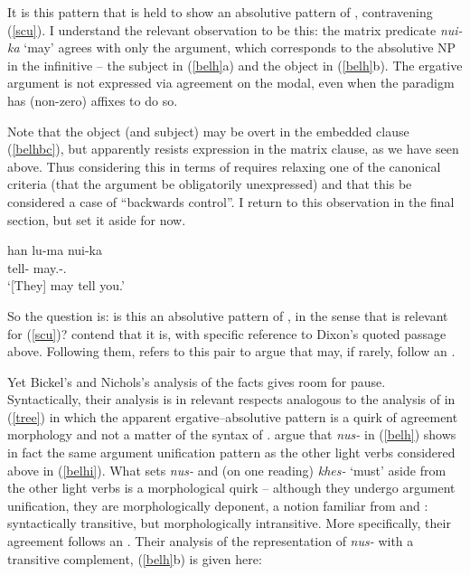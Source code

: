 \documentclass[output=paper]{langsci/langscibook}
\begin{document}
It is this pattern that is held to show an absolutive pattern of ,
contravening (\ref{scu}). I understand the relevant observation to be this: the
matrix predicate \emph{nui-ka} `may' agrees with only the \Ssg{} argument,
which corresponds to the absolutive NP in the infinitive -- the subject in
(\ref{belh}a) and the object in (\ref{belh}b). The ergative argument is not
expressed via agreement on the modal, even when the paradigm has (non-zero)
affixes to do so.

Note that the object (and subject) may be overt in the embedded clause
(\ref{belhbc}), but apparently resists expression in the matrix clause, as we
have seen above. Thus considering this in terms of  requires relaxing
one of the canonical criteria (that the argument be obligatorily unexpressed)
and that this be considered a case of \enquote{backwards control}. I return to
this observation in the final section, but set it aside for now.

\ea \label{belhbc}
       \gll han lu-ma nui-ka \\
       \Second{} tell-\Inf{} may.\Npst-\Second.\Su{} \\
	\glt `[They] may tell you.' \citep[156]{bickel04}
\z

So the question is: is this an absolutive pattern of , in the sense that
is relevant for (\ref{scu})? \citet{bicknich01} contend that it is, with
specific reference to Dixon's quoted passage above. Following them,
\cite{malchukov14} refers to this pair to argue that  may, if rarely,
follow an .

Yet Bickel's and Nichols's analysis of the facts gives room for pause.
Syntactically, their analysis is in relevant respects analogous to the analysis
of  in (\ref{tree}) in which the apparent ergative--absolutive pattern
is a quirk of agreement morphology and not a matter of the syntax of .
\cite{bickel04,bicknich01} argue that \emph{nus-} in (\ref{belh}) shows in fact
the same argument unification pattern as the other light verbs considered above
in (\ref{belhi}). What sets \emph{nus-} and (on one reading) \emph{khes-}
`must' aside from the other light verbs is a morphological quirk -- although
they undergo argument unification, they are morphologically deponent, a notion
familiar from  and  \citep{baermanetal07}: syntactically transitive,
but morphologically intransitive. More specifically, their agreement follows an
. Their analysis of the representation of \emph{nus-} with
a transitive complement, (\ref{belh}b) is given here:
\end{document}
